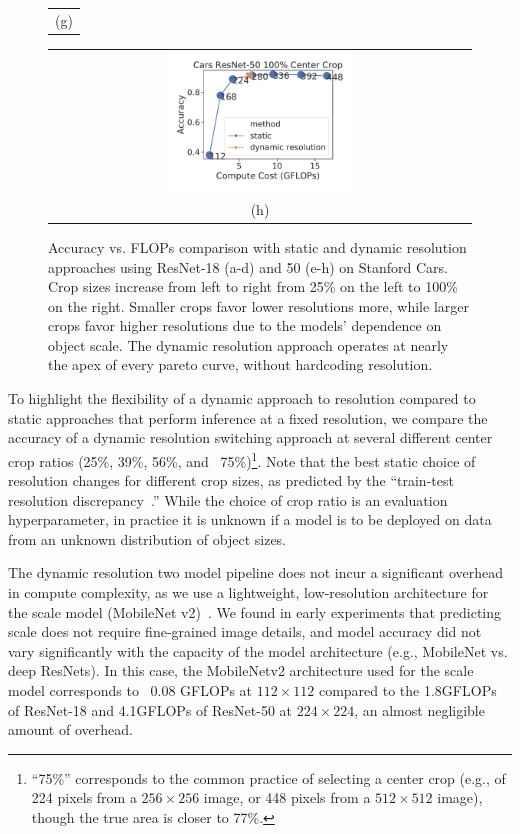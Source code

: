 \begin{figure}[h!]
\begin{tabular}{@{}c@{}}
    \small (g)
    \end{tabular}
    \begin{tabular}{@{}c@{}}
    \includegraphics[width=0.45\textwidth]{e2e_figures/cars_resnet50_full_center.pdf} \\
    \small (h)
    \end{tabular}
    \caption{Accuracy vs. FLOPs comparison with static and dynamic resolution approaches using ResNet-18 (a-d) and 50 (e-h) on Stanford Cars. Crop sizes increase from left to right from 25\% on the left to 100\% on the right. Smaller crops favor lower resolutions more, while larger crops favor higher resolutions due to the models' dependence on object scale. The dynamic resolution approach operates at nearly the apex of every pareto curve, without hardcoding resolution.}
    \label{fig:accflops_resnet_cars}
\end{figure}
 To highlight the flexibility of a dynamic approach to resolution compared to static approaches that perform inference at a fixed resolution, we compare the accuracy of a dynamic resolution switching approach at several different center crop ratios (25\%, 39\%, 56\%, and ~75\%)\footnote{``75\%'' corresponds to the common practice of selecting a center crop (e.g., of 224 pixels from a $256\times256$ image, or 448 pixels from a $512\times512$ image), though the true area is closer to 77\%.}.
 Note that the best static choice of resolution changes for different crop sizes, as predicted by the ``train-test resolution discrepancy~\cite{touvron2019fixing}.''
While the choice of crop ratio is an evaluation hyperparameter, in practice it is unknown if a model is to be deployed on data from an unknown distribution of object sizes.

The dynamic resolution two model pipeline does not incur a significant overhead in compute complexity, as we use a lightweight, low-resolution architecture for the scale model (MobileNet v2)~\cite{sandler2018mobilenetv2}. 
We found in early experiments that predicting scale does not require fine-grained image details, and model accuracy did not vary significantly with the capacity of the model architecture (e.g., MobileNet vs. deep ResNets). 
In this case, the MobileNetv2 architecture used for the scale model corresponds to ~0.08 GFLOPs at $112\times112$ compared to the 1.8GFLOPs of ResNet-18 and 4.1GFLOPs of ResNet-50 at $224\times224$, an almost negligible amount of overhead.


